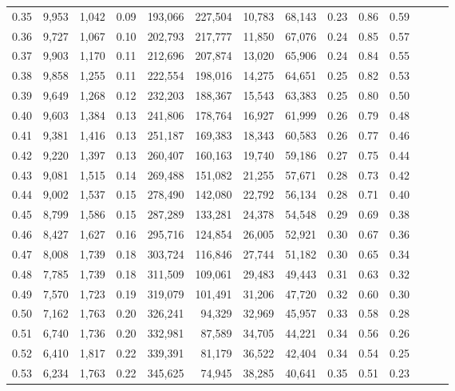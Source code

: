 \begin{tabular}{rrrrrrrrrrrrrr}
0.35 &  9,953 &  1,042 &  0.09 &  193,066 &  227,504 &  10,783 &  68,143 &  0.23 &  0.86 &      0.59 \\
0.36 &  9,727 &  1,067 &  0.10 &  202,793 &  217,777 &  11,850 &  67,076 &  0.24 &  0.85 &      0.57 \\
0.37 &  9,903 &  1,170 &  0.11 &  212,696 &  207,874 &  13,020 &  65,906 &  0.24 &  0.84 &      0.55 \\
0.38 &  9,858 &  1,255 &  0.11 &  222,554 &  198,016 &  14,275 &  64,651 &  0.25 &  0.82 &      0.53 \\
0.39 &  9,649 &  1,268 &  0.12 &  232,203 &  188,367 &  15,543 &  63,383 &  0.25 &  0.80 &      0.50 \\
0.40 &  9,603 &  1,384 &  0.13 &  241,806 &  178,764 &  16,927 &  61,999 &  0.26 &  0.79 &      0.48 \\
0.41 &  9,381 &  1,416 &  0.13 &  251,187 &  169,383 &  18,343 &  60,583 &  0.26 &  0.77 &      0.46 \\
0.42 &  9,220 &  1,397 &  0.13 &  260,407 &  160,163 &  19,740 &  59,186 &  0.27 &  0.75 &      0.44 \\
0.43 &  9,081 &  1,515 &  0.14 &  269,488 &  151,082 &  21,255 &  57,671 &  0.28 &  0.73 &      0.42 \\
0.44 &  9,002 &  1,537 &  0.15 &  278,490 &  142,080 &  22,792 &  56,134 &  0.28 &  0.71 &      0.40 \\
0.45 &  8,799 &  1,586 &  0.15 &  287,289 &  133,281 &  24,378 &  54,548 &  0.29 &  0.69 &      0.38 \\
0.46 &  8,427 &  1,627 &  0.16 &  295,716 &  124,854 &  26,005 &  52,921 &  0.30 &  0.67 &      0.36 \\
0.47 &  8,008 &  1,739 &  0.18 &  303,724 &  116,846 &  27,744 &  51,182 &  0.30 &  0.65 &      0.34 \\
0.48 &  7,785 &  1,739 &  0.18 &  311,509 &  109,061 &  29,483 &  49,443 &  0.31 &  0.63 &      0.32 \\
0.49 &  7,570 &  1,723 &  0.19 &  319,079 &  101,491 &  31,206 &  47,720 &  0.32 &  0.60 &      0.30 \\
0.50 &  7,162 &  1,763 &  0.20 &  326,241 &   94,329 &  32,969 &  45,957 &  0.33 &  0.58 &      0.28 \\
0.51 &  6,740 &  1,736 &  0.20 &  332,981 &   87,589 &  34,705 &  44,221 &  0.34 &  0.56 &      0.26 \\
0.52 &  6,410 &  1,817 &  0.22 &  339,391 &   81,179 &  36,522 &  42,404 &  0.34 &  0.54 &      0.25 \\
0.53 &  6,234 &  1,763 &  0.22 &  345,625 &   74,945 &  38,285 &  40,641 &  0.35 &  0.51 &      0.23 \\

\end{tabular}
